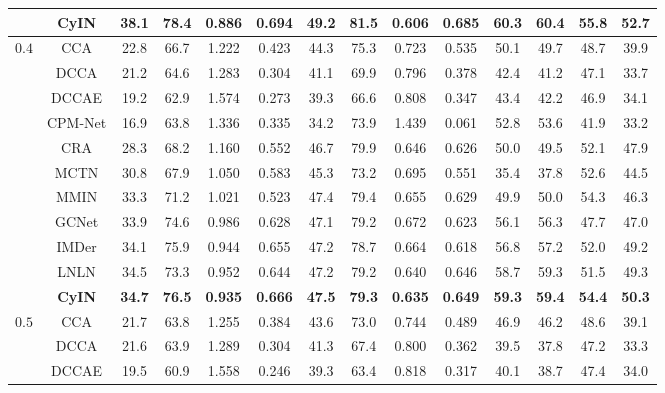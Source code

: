 \documentclass{article}
\begin{document}
\begin{table}[htbp]
{\begin{tabular}{cccccccccccccc}
    & \textbf{CyIN} & \textbf{38.1} & \textbf{78.4} & \textbf{0.886} & \textbf{0.694} & 49.2 & \textbf{81.5} & \textbf{0.606} & \textbf{0.685} & \textbf{60.3} & \textbf{60.4} & \textbf{55.8} & \textbf{52.7} \\  
    \midrule[0.5pt]
    \multirow{11}{*}{$0.4$} ~ & CCA & 22.8  & 66.7  & 1.222  & 0.423  & 44.3  & 75.3  & 0.723  & 0.535  & 50.1  & 49.7  & 48.7  & 39.9  \\ 
        ~ & DCCA & 21.2  & 64.6  & 1.283  & 0.304  & 41.1  & 69.9  & 0.796  & 0.378  & 42.4  & 41.2  & 47.1  & 33.7  \\ 
        ~ & DCCAE & 19.2  & 62.9  & 1.574  & 0.273  & 39.3  & 66.6  & 0.808  & 0.347  & 43.4  & 42.2  & 46.9  & 34.1  \\ 
        ~ & CPM-Net & 16.9  & 63.8  & 1.336  & 0.335  & 34.2  & 73.9  & 1.439  & 0.061  & 52.8  & 53.6  & 41.9  & 33.2  \\ 
        ~ & CRA & 28.3  & 68.2  & 1.160  & 0.552  & 46.7  & 79.9  & 0.646  & 0.626  & 50.0  & 49.5  & 52.1  & 47.9  \\ 
        ~ & MCTN & 30.8  & 67.9  & 1.050  & 0.583  & 45.3  & 73.2  & 0.695  & 0.551  & 35.4  & 37.8  & 52.6  & 44.5  \\ 
        ~ & MMIN & 33.3  & 71.2  & 1.021  & 0.523  & 47.4  & 79.4  & 0.655  & 0.629  & 49.9  & 50.0  & 54.3  & 46.3 \\ 
        ~ & GCNet & 33.9  & 74.6  & 0.986  & 0.628  & 47.1  & 79.2  & 0.672  & 0.623  & 56.1  & 56.3  & 47.7  & 47.0  \\ 
        ~ & IMDer & 34.1  & 75.9  & 0.944  & 0.655  & 47.2  & 78.7  & 0.664  & 0.618  & 56.8  & 57.2  & 52.0  & 49.2 \\
        ~ & LNLN & 34.5  & 73.3  & 0.952  & 0.644  & 47.2  & 79.2  & 0.640  & 0.646  & 58.7  & 59.3  & 51.5  & 49.3  \\ 
    & \textbf{CyIN} & \textbf{34.7} & \textbf{76.5} & \textbf{0.935} & \textbf{0.666} & \textbf{47.5} & \textbf{79.3} & \textbf{0.635} & \textbf{0.649} & \textbf{59.3} & \textbf{59.4} & \textbf{54.4} & \textbf{50.3} \\ 
    \midrule[0.5pt]
    \multirow{11}{*}{$0.5$} ~ & CCA & 21.7  & 63.8  & 1.255  & 0.384  & 43.6  & 73.0  & 0.744  & 0.489  & 46.9  & 46.2  & 48.6  & 39.1  \\ 
        ~ & DCCA & 21.6  & 63.9  & 1.289  & 0.304  & 41.3  & 67.4  & 0.800  & 0.362  & 39.5  & 37.8  & 47.2  & 33.3  \\ 
        ~ & DCCAE & 19.5  & 60.9  & 1.558  & 0.246  & 39.3  & 63.4  & 0.818  & 0.317  & 40.1  & 38.7  & 47.4  & 34.0  \\ 

\end{tabular}}
\end{table}
\end{document}
